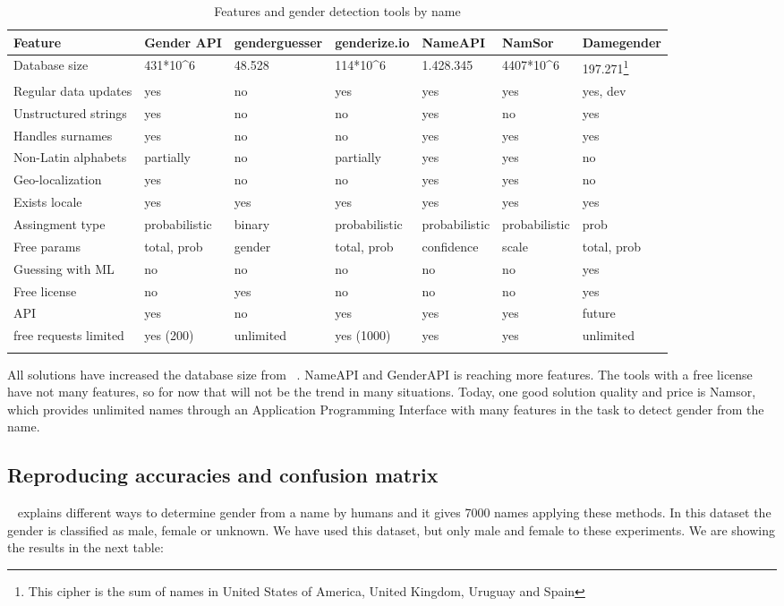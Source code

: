 \documentclass[a4paper]{article}
\begin{document}
\begin{longtable}[]{@{}lllllll@{}}
\toprule
Feature & Gender API & genderguesser & genderize.io & NameAPI & NamSor & Damegender\tabularnewline
\midrule
\endhead
Database size & 431*10^6 & 48.528 & 114*10^6 & 1.428.345 & 4407*10^6  & 197.271\footnote{This cipher is the sum of names in United States of America, United Kingdom, Uruguay and Spain} \tabularnewline
Regular data updates & yes & no & yes & yes & yes & yes, dev\tabularnewline
Unstructured strings & yes & no & no & yes & no & yes\tabularnewline
Handles surnames & yes & no & no & yes & yes & yes\tabularnewline
Non-Latin alphabets & partially & no & partially & yes & yes & no\tabularnewline
Geo-localization & yes & no & no & yes & yes & no\tabularnewline
Exists locale & yes & yes & yes & yes & yes & yes\tabularnewline
Assingment type & probabilistic & binary & probabilistic & probabilistic & probabilistic & prob\tabularnewline
Free params & total, prob & gender & total, prob & confidence & scale & total, prob\tabularnewline
Guessing with ML & no & no & no & no & no & yes\tabularnewline
Free license & no & yes & no & no & no & yes\tabularnewline
API & yes & no & yes & yes & yes & future\tabularnewline
free requests limited & yes (200) & unlimited & yes (1000) & yes & yes & unlimited\tabularnewline
\bottomrule
\caption{Features and gender detection tools by name}
\label{table:featuresAndGenderDetectionToolsByName}
\end{longtable}

All solutions have increased the database size from
~\cite{10.7717/peerj-cs.156}. NameAPI and GenderAPI is reaching more
features. The tools with a free license have not many features, so for
now that will not be the trend in many situations. Today, one good
solution quality and price is Namsor, which provides unlimited names
through an Application Programming Interface with many features in the
task to detect gender from the name.

\subsection*{Reproducing accuracies and confusion matrix}

~\cite{10.7717/peerj-cs.156} explains different ways to determine
gender from a name by humans and it gives 7000 names applying these
methods. In this dataset the gender is classified as male, female or
unknown. We have used this dataset, but only male and female to these
experiments. We are showing the results in the next table:
\end{document}

